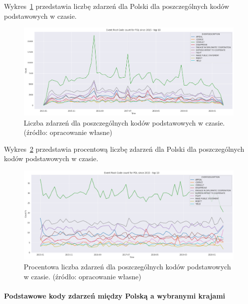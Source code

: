 \documentclass[11pt]{report}
\begin{document}
    Wykres~\ref{fig:PLPERCinTIME} przedstawia liczbę zdarzeń dla Polski dla poszczególnych kodów podstawowych w czasie.
    \begin{figure}[!htp]
        \centering
        \includegraphics[width=\linewidth]{fig/PL/PLERCinTIME.png}
        \caption{Liczba zdarzeń dla poszczególnych kodów podstawowych w czasie. (źródło: opracowanie własne)}
        \label{fig:PLPERCinTIME}
    \end{figure}

    Wykres~\ref{fig:PLPERCpercinTIME} przedstawia procentową liczbę zdarzeń dla Polski dla poszczególnych kodów podstawowych w czasie.
    \begin{figure}[!htp]
        \centering
        \includegraphics[width=\linewidth]{fig/PL/PLERCpercinTIME.png}
        \caption{Procentowa liczba zdarzeń dla poszczególnych kodów podstawowych w czasie. (źródło: opracowanie własne)}
        \label{fig:PLPERCpercinTIME}
    \end{figure}

    \paragraph{Podstawowe kody zdarzeń między Polską a wybranymi krajami}
\end{document}
